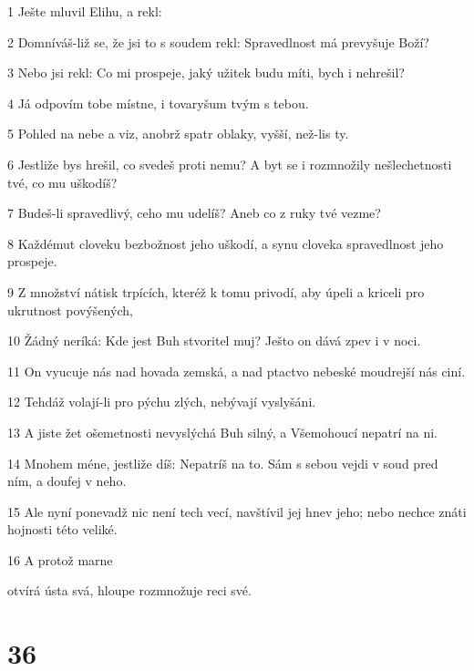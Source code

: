 \par 1 Ješte mluvil Elihu, a rekl:
\par 2 Domníváš-liž se, že jsi to s soudem rekl: Spravedlnost má prevyšuje Boží?
\par 3 Nebo jsi rekl: Co mi prospeje, jaký užitek budu míti, bych i nehrešil?
\par 4 Já odpovím tobe místne, i tovaryšum tvým s tebou.
\par 5 Pohled na nebe a viz, anobrž spatr oblaky, vyšší, než-lis ty.
\par 6 Jestliže bys hrešil, co svedeš proti nemu? A byt se i rozmnožily nešlechetnosti tvé, co mu uškodíš?
\par 7 Budeš-li spravedlivý, ceho mu udelíš? Aneb co z ruky tvé vezme?
\par 8 Každémut cloveku bezbožnost jeho uškodí, a synu cloveka spravedlnost jeho prospeje.
\par 9 Z množství nátisk trpících, kteréž k tomu privodí, aby úpeli a kriceli pro ukrutnost povýšených,
\par 10 Žádný neríká: Kde jest Buh stvoritel muj? Ješto on dává zpev i v noci.
\par 11 On vyucuje nás nad hovada zemská, a nad ptactvo nebeské moudrejší nás ciní.
\par 12 Tehdáž volají-li pro pýchu zlých, nebývají vyslyšáni.
\par 13 A jiste žet ošemetnosti nevyslýchá Buh silný, a Všemohoucí nepatrí na ni.
\par 14 Mnohem méne, jestliže díš: Nepatríš na to. Sám s sebou vejdi v soud pred ním, a doufej v neho.
\par 15 Ale nyní ponevadž nic není tech vecí, navštívil jej hnev jeho; nebo nechce znáti hojnosti této veliké.
\par 16 A protož marne \par otvírá ústa svá, hloupe rozmnožuje reci své.

\chapter{36}

